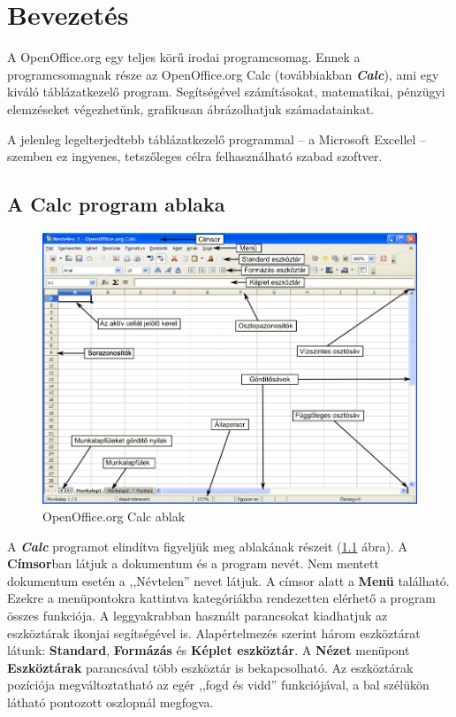 \chapter{Bevezetés}
\thispagestyle{empty}

A OpenOffice.org egy teljes körű irodai programcsomag.  Ennek a
programcsomagnak része az OpenOffice.org Calc (továbbiakban
\textbf{\textit{Calc}}), ami egy kiváló táblázatkezelő
program. Segítségével számításokat, matematikai,
pénzügyi elemzéseket végezhetünk, grafikusan
ábrázolhatjuk számadatainkat.

A jelenleg legelterjedtebb táblázatkezelő programmal --  a
Microsoft Excellel --  szemben ez ingyenes, tetszőleges célra
felhasználható szabad szoftver.


\section{A Calc program ablaka}

\begin{figure}[!h]
\begin{center}
\includegraphics[width=13.999cm]{oocalcv1-img2.png}
\caption{OpenOffice.org Calc ablak}\label{Ablak}
\end{center}
\end{figure}

A \textbf{\textit{Calc}} programot elindítva figyeljük meg
ablakának részeit (\ref{Ablak} ábra). A \textbf{Címsor}ban látjuk a
 dokumentum és a program nevét. Nem mentett dokumentum esetén a
,,Névtelen'' nevet látjuk.  A
címsor alatt a \textbf{Menü} található. Ezekre a menüpontokra
kattintva kategóriákba rendezetten elérhető a program
összes funkciója. A  leggyakrabban használt parancsokat
kiadhatjuk az eszköztárak ikonjai segítségével is.
Alapértelmezés szerint három eszköztárat látunk:
\textbf{Standard}, \textbf{Formázás} és \textbf{Képlet
eszköztár}. A \textbf{Nézet} menüpont \textbf{Eszköztárak}
parancsával több eszköztár is bekapcsolható. Az
 eszköztárak pozíciója megváltoztatható az egér
,,fogd és vidd'' funkciójával, a
bal szélükön látható pontozott oszlopnál megfogva.

